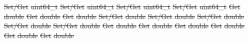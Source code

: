 \documentclass[12pt]{report} %
\providecommand{\DIFdeltex}[1]{{\protect\color{red}\sout{#1}}}                      %
\providecommand{\DIFdel}[1]{\texorpdfstring{\DIFdeltex{#1}}{}} %
\begin{document}
\DIFdel{Set/Get }%
\DIFdel{uint64\_t }%
\DIFdel{Set/Get }%
\DIFdel{uint64\_t }%
\DIFdel{Set/Get }%
\DIFdel{uint64\_t }%
\DIFdel{Set/Get }%
\DIFdel{uint64\_t }%
\DIFdel{Get }%
\DIFdel{double }%
\DIFdel{Get }%
\DIFdel{double }%
\DIFdel{Get }%
\DIFdel{double }%
\DIFdel{Set/Get }%
\DIFdel{double }%
\DIFdel{Set/Get }%
\DIFdel{double }%
\DIFdel{Set/Get }%
\DIFdel{double }%
\DIFdel{Set/Get }%
\DIFdel{double }%
\DIFdel{Set/Get }%
\DIFdel{double }%
\DIFdel{Get }%
\DIFdel{double }%
\DIFdel{Get }%
\DIFdel{double }%
\DIFdel{Get }%
\DIFdel{double }%
\DIFdel{Get }%
\DIFdel{double }%
\DIFdel{Get }%
\DIFdel{double }%
\DIFdel{Get }%
\DIFdel{double }%
\end{document}

